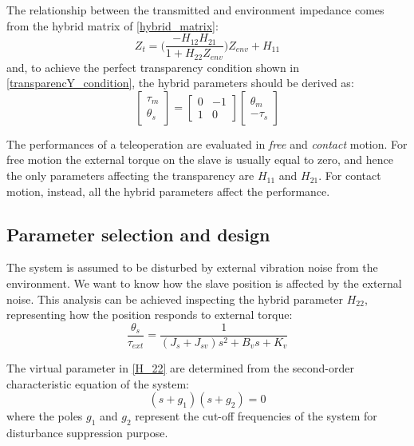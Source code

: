 The relationship between the transmitted and environment impedance comes from the hybrid matrix of \eqref{hybrid_matrix}:
\begin{equation}
	Z_t = \big(\dfrac{-H_{12} H_{21}}{1 + H_{22} Z_{env}}\big)Z_{env} + H_{11}
\end{equation}
and, to achieve the perfect transparency condition shown in \eqref{transparencY_condition}, the hybrid parameters should be derived as:
\begin{equation}
	\begin{bmatrix}
	\tau_m \\ \theta_s
	\end{bmatrix} = 
	\begin{bmatrix}
	0 & -1 \\ 1 & 0
	\end{bmatrix}
	\begin{bmatrix}
	\theta_m \\ -\tau_s
	\end{bmatrix}
\end{equation}

The performances of a teleoperation are evaluated in \emph{free} and \emph{contact} motion. For free motion the external torque on the slave is usually equal to zero, and hence the only parameters affecting the transparency are $ H_{11} $ and $ H_{21} $. For contact motion, instead, all the hybrid parameters affect the performance.

\subsection{Parameter selection and design}\label{ParamSelect} 

The system is assumed to be disturbed by external vibration noise from the environment. We want to know how the slave position is affected by the external noise. This analysis can be achieved inspecting the hybrid parameter $ H_{22} $, representing how the position responds to external torque:
\begin{equation}
	\dfrac{\theta_s}{\tau_{ext}} = \dfrac{1}{(J_s + J_{sv}) s^2 + B_v s + K_v}
	\label{H_22}
\end{equation}

The virtual parameter in \eqref{H_22} are determined from the second-order characteristic equation of the system:
\begin{equation}
	(s + g_1)(s + g_2) = 0
	\label{charact_equation}
\end{equation}  
where the poles $ g_1 $ and $ g_2 $ represent the cut-off frequencies of the system for disturbance suppression purpose.

